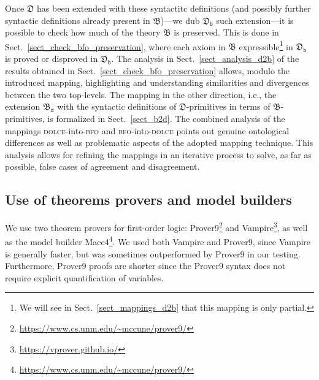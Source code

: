 \documentclass[ao]{iosart2x}
\newcommand{\dolce}{{\textsc{dolce}}}
\newcommand{\bfo}{{\textsc{bfo}}}
\newcommand {\thdolce} {\ensuremath{\mathfrak{D}}}
\newcommand {\thbfo} {\ensuremath{\mathfrak{B}}}
\newcommand {\thbfobdmap} {\ensuremath{\mathfrak{B}_\texttt{d}}}
\newcommand {\thdolcedbmap} {\ensuremath{\mathfrak{D}_\texttt{b}}}
\begin{document}
Once {$\thdolce$} has been extended with these syntactitc definitions (and possibly further syntactic definitions already present in {$\thbfo$})---we dub $\thdolcedbmap$ such extension---it is possible to check how much of the theory $\thbfo$ is preserved. This is done in Sect.~\ref{sect_check_bfo_preservation}, where each axiom in $\thbfo$ expressible\footnote{We will see in Sect.~\ref{sect_mappings_d2b} that this mapping is only partial.} in $\thdolcedbmap$ is proved or disproved in $\thdolcedbmap$. The analysis in Sect.~\ref{sect_analysis_d2b} of the results obtained in Sect.~\ref{sect_check_bfo_preservation} allows, modulo the introduced mapping, highlighting and understanding similarities and divergences between the two top-levels. The mapping in the other direction, i.e., the extension $\thbfobdmap$ with the syntactic definitions of {$\thdolce$}-primitives in terms of {$\thbfo$}-primitives, is formalized in Sect.~\ref{sect_b2d}. The combined analysis of the mappings {\dolce}-into-{\bfo} and {\bfo}-into-{\dolce} points out genuine ontological differences as well as problematic aspects of the adopted mapping technique. This analysis allows for refining the mappings in an iterative process to solve, as far as possible, false cases of agreement and disagreement.

\subsection{Use of theorems provers and model builders}

We use two theorem provers for first-order logic: Prover9\footnote{\url{https://www.cs.unm.edu/~mccune/prover9/}} and Vampire\footnote{\url{https://vprover.github.io/}}, as well as the model builder Mace4\footnote{\url{https://www.cs.unm.edu/~mccune/prover9/}}.
We used both Vampire and Prover9, since Vampire is generally faster, but was sometimes outperformed by Prover9 in our testing. Furthermore, Prover9 proofs are shorter since the Prover9 syntax does not require explicit quantification of variables.

\end{document}
